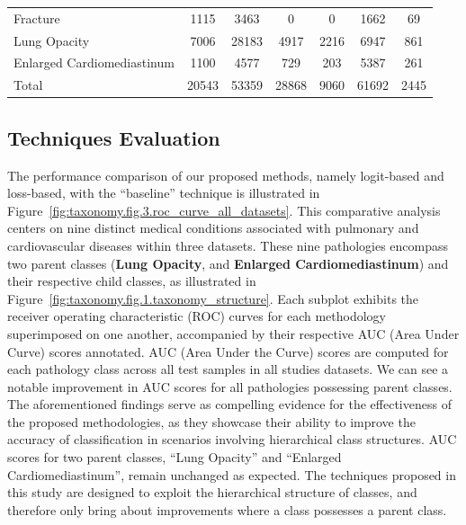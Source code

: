 \documentclass[review,1p,times,numbers]{elsarticle}
\begin{document}
\begin{table}[htbp]
\begin{tabular}{lcccccc}
        Fracture           & 1115 & 3463  & 0    & 0    & 1662 & 69  \\
        Lung Opacity& 7006 & 28183 &
        \cellcolor{table_row_highlight}4917 &
        \cellcolor{table_row_highlight}2216 &
        \cellcolor{table_row_highlight}6947 &
        \cellcolor{table_row_highlight}861 \\
        Enlarged Cardiomediastinum & 1100 & 4577 &
        \cellcolor{table_row_highlight}729 &
        \cellcolor{table_row_highlight}203 &
        \cellcolor{table_row_highlight}5387 &
        \cellcolor{table_row_highlight}261 \\
        \rowcolor[HTML]{79A8A4}
        Total & 20543 & 53359 & 28868 & 9060 & 61692 & 2445
    \end{tabular}
\end{table}
%

\subsection{Techniques Evaluation}
The performance comparison of our proposed methods, namely logit-based and loss-based, with the ``baseline'' technique is illustrated in Figure~\ref{fig:taxonomy.fig.3.roc_curve_all_datasets}. This comparative analysis centers on nine distinct medical conditions associated with pulmonary and cardiovascular diseases within three datasets. These nine pathologies encompass two parent classes (\textbf{Lung Opacity}, and \textbf{Enlarged Cardiomediastinum}) and their respective child classes, as illustrated in Figure~\ref{fig:taxonomy.fig.1.taxonomy_structure}. Each subplot exhibits the receiver operating characteristic (ROC) curves for each methodology superimposed on one another, accompanied by their respective AUC (Area Under Curve) scores annotated. AUC (Area Under the Curve) scores are computed for each pathology class across all test samples in all studies datasets. We can see a notable improvement in AUC scores for all pathologies possessing parent classes. The aforementioned findings serve as compelling evidence for the effectiveness of the proposed methodologies, as they showcase their ability to improve the accuracy of classification in scenarios involving hierarchical class structures. AUC scores for two parent classes, ``Lung Opacity'' and ``Enlarged Cardiomediastinum'', remain unchanged as expected. The techniques proposed in this study are designed to exploit the hierarchical structure of classes, and therefore only bring about improvements where a class possesses a parent class.
\end{document}
